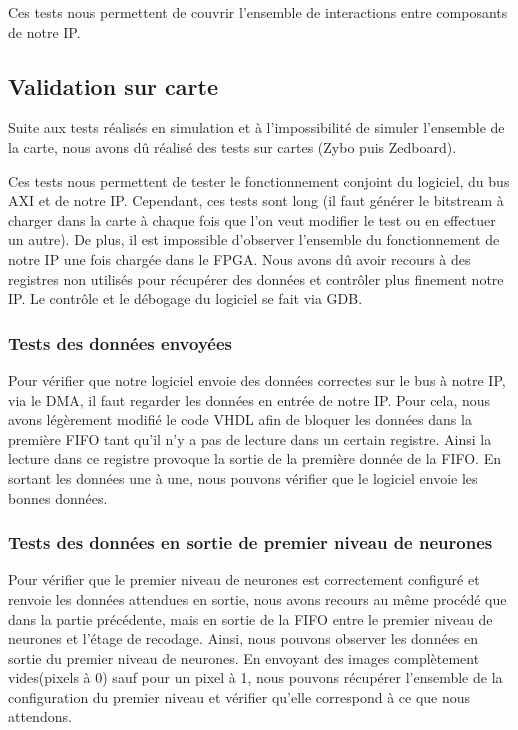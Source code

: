 Ces tests nous permettent de couvrir l'ensemble de interactions entre composants
de notre IP.

\subsection{Validation sur carte}

Suite aux tests réalisés en simulation et à l'impossibilité de simuler
l'ensemble de la carte, nous avons dû réalisé des tests sur cartes (Zybo puis Zedboard).

Ces tests nous permettent de tester le fonctionnement conjoint du logiciel, du
bus AXI et de notre IP. Cependant, ces tests sont long (il faut générer le
bitstream à charger dans la carte à chaque fois que l'on veut modifier le test ou
en effectuer un autre). De plus, il est impossible d'observer l'ensemble du
fonctionnement de notre IP une fois chargée dans le FPGA. Nous avons dû avoir
recours à des registres non utilisés pour récupérer des données et contrôler
plus finement notre IP. Le contrôle et le débogage du logiciel se fait via GDB.

\subsubsection{Tests des données envoyées}

Pour vérifier que notre logiciel envoie des données correctes sur le bus à notre
IP, via le DMA, il faut regarder les données en entrée de notre IP.
Pour cela, nous avons légèrement modifié le code VHDL afin de bloquer les
données dans la première FIFO tant qu'il n'y a pas de lecture dans
un certain registre. Ainsi la lecture dans ce registre provoque la sortie de
la première donnée de la FIFO. En sortant les données une à une, nous pouvons
vérifier que le logiciel envoie les bonnes données.

\subsubsection{Tests des données en sortie de premier niveau de neurones}

Pour vérifier que le premier niveau de neurones est correctement configuré et
renvoie les données attendues en sortie, nous avons recours au même procédé que
dans la partie précédente, mais en sortie de la FIFO entre le premier niveau
de neurones et l'étage de recodage.
Ainsi, nous pouvons observer les données en sortie du premier niveau de neurones.
En envoyant des images complètement vides(pixels à 0) sauf pour un pixel à 1,
nous pouvons récupérer l'ensemble de la configuration du premier niveau et
vérifier qu'elle correspond à ce que nous attendons.

